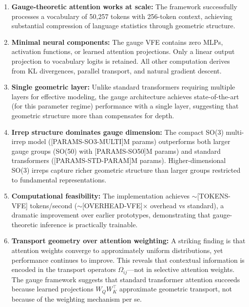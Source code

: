 \documentclass[twoside,11pt]{article}
\begin{document}
\begin{enumerate}
  \item \textbf{Gauge-theoretic attention works at scale:} The framework successfully processes a vocabulary of 50,257 tokens with 256-token context, achieving substantial compression of language statistics through geometric structure.

  \item \textbf{Minimal neural components:} The gauge VFE contains zero MLPs, activation functions, or learned attention projections. Only a linear output projection to vocabulary logits is retained. All other computation derives from KL divergences, parallel transport, and natural gradient descent.

  \item \textbf{Single geometric layer:} Unlike standard transformers requiring multiple layers for effective modeling, the gauge architecture achieves state-of-the-art (for this parameter regime) performance with a single layer, suggesting that geometric structure more than compensates for depth.

  \item \textbf{Irrep structure dominates gauge dimension:} The compact SO(3) multi-irrep model ([PARAMS-SO3-MULTI]M params) outperforms both larger gauge groups (SO(50) with [PARAMS-SO50]M params) and standard transformers ([PARAMS-STD-PARAM]M params). Higher-dimensional SO(3) irreps capture richer geometric structure than larger groups restricted to fundamental representations.

  \item \textbf{Computational feasibility:} The implementation achieves $\sim$[TOKENS-VFE] tokens/second ($\sim$[OVERHEAD-VFE]$\times$ overhead vs standard), a dramatic improvement over earlier prototypes, demonstrating that gauge-theoretic inference is practically trainable.

  \item \textbf{Transport geometry over attention weighting:} A striking finding is that attention weights converge to approximately uniform distributions, yet performance continues to improve. This reveals that contextual information is encoded in the transport operators $\Omega_{ij}$---not in selective attention weights. The gauge framework suggests that standard transformer attention succeeds because learned projections $W_Q W_K^\top$ approximate geometric transport, not because of the weighting mechanism per se.
\end{enumerate}
\end{document}
